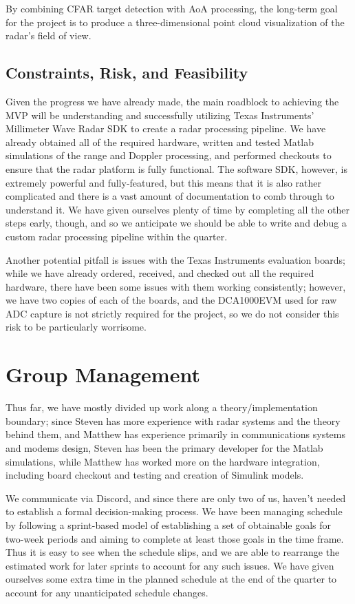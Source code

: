 \documentclass[12pt, oneside, titlepage, final]{article}
\begin{document}
	By combining CFAR target detection with AoA processing, the long-term goal for the project is to
	produce a three-dimensional point cloud visualization of the radar's field of view.

	\subsection{Constraints, Risk, and Feasibility}

	Given the progress we have already made, the main roadblock to achieving the MVP will be understanding
	and successfully utilizing Texas Instruments' Millimeter Wave Radar SDK to create a radar processing
	pipeline. We have already obtained all of the required hardware, written and tested Matlab simulations
	of the range and Doppler processing, and performed checkouts to ensure that the radar platform is
	fully functional. The software SDK, however, is extremely powerful and fully-featured, but this means
	that it is also rather complicated and there is a vast amount of documentation to comb through to
	understand it. We have given ourselves plenty of time by completing all the other steps early, though,
	and so we anticipate we should be able to write and debug a custom radar processing pipeline within
	the quarter.

	Another potential pitfall is issues with the Texas Instruments evaluation boards; while we have
	already ordered, received, and checked out all the required hardware, there have been some issues with
	them working consistently; however, we have two copies of each of the boards, and the DCA1000EVM used
	for raw ADC capture is not strictly required for the project, so we do not consider this risk to be
	particularly worrisome.

	\section{Group Management}

	Thus far, we have mostly divided up work along a theory/implementation boundary; since Steven has more
	experience with radar systems and the theory behind them, and Matthew has experience primarily in
	communications systems and modems design, Steven has been the primary developer for the Matlab
	simulations, while Matthew has worked more on the hardware integration, including board checkout and
	testing and creation of Simulink models.

	We communicate via Discord, and since there are only two of us, haven't needed to establish a formal
	decision-making process. We have been managing schedule by following a sprint-based model of
	establishing a set of obtainable goals for two-week periods and aiming to complete at least those
	goals in the time frame. Thus it is easy to see when the schedule slips, and we are able to rearrange
	the estimated work for later sprints to account for any such issues. We have given ourselves some
	extra time in the planned schedule at the end of the quarter to account for any unanticipated schedule
	changes.
\end{document}
